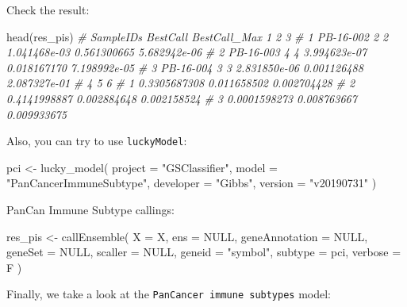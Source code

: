\documentclass[
  12pt,
]{book}
\newenvironment{Shaded}{\begin{snugshade}}{\end{snugshade}}
\newcommand{\AttributeTok}[1]{\textcolor[rgb]{0.77,0.63,0.00}{#1}}
\newcommand{\CommentTok}[1]{\textcolor[rgb]{0.56,0.35,0.01}{\textit{#1}}}
\newcommand{\ConstantTok}[1]{\textcolor[rgb]{0.00,0.00,0.00}{#1}}
\newcommand{\FunctionTok}[1]{\textcolor[rgb]{0.00,0.00,0.00}{#1}}
\newcommand{\NormalTok}[1]{#1}
\newcommand{\OtherTok}[1]{\textcolor[rgb]{0.56,0.35,0.01}{#1}}
\newcommand{\StringTok}[1]{\textcolor[rgb]{0.31,0.60,0.02}{#1}}
\begin{document}
Check the result:

\begin{Shaded}
\begin{Highlighting}[]
\FunctionTok{head}\NormalTok{(res\_pis)}
\CommentTok{\#   SampleIDs BestCall BestCall\_Max            1           2            3}
\CommentTok{\# 1 PB{-}16{-}002        2            2 1.041468e{-}03 0.561300665 5.682942e{-}06}
\CommentTok{\# 2 PB{-}16{-}003        4            4 3.994623e{-}07 0.018167170 7.198992e{-}05}
\CommentTok{\# 3 PB{-}16{-}004        3            3 2.831850e{-}06 0.001126488 2.087327e{-}01}
\CommentTok{\#              4           5           6}
\CommentTok{\# 1 0.3305687308 0.011658502 0.002704428}
\CommentTok{\# 2 0.4141998887 0.002884648 0.002158524}
\CommentTok{\# 3 0.0001598273 0.008763667 0.009933675}
\end{Highlighting}
\end{Shaded}

Also, you can try to use \texttt{luckyModel}:

\begin{Shaded}
\begin{Highlighting}[]
\NormalTok{pci }\OtherTok{\textless{}{-}} \FunctionTok{lucky\_model}\NormalTok{(}
  \AttributeTok{project =} \StringTok{"GSClassifier"}\NormalTok{,}
  \AttributeTok{model =} \StringTok{"PanCancerImmuneSubtype"}\NormalTok{,}
  \AttributeTok{developer =} \StringTok{"Gibbs"}\NormalTok{,}
  \AttributeTok{version =} \StringTok{"v20190731"}
\NormalTok{)}
\end{Highlighting}
\end{Shaded}

PanCan Immune Subtype callings:

\begin{Shaded}
\begin{Highlighting}[]
\NormalTok{res\_pis }\OtherTok{\textless{}{-}} \FunctionTok{callEnsemble}\NormalTok{(}
    \AttributeTok{X =}\NormalTok{ X,}
    \AttributeTok{ens =} \ConstantTok{NULL}\NormalTok{,}
    \AttributeTok{geneAnnotation =} \ConstantTok{NULL}\NormalTok{,}
    \AttributeTok{geneSet =} \ConstantTok{NULL}\NormalTok{,}
    \AttributeTok{scaller =} \ConstantTok{NULL}\NormalTok{,}
    \AttributeTok{geneid =} \StringTok{"symbol"}\NormalTok{,}
    \AttributeTok{subtype =}\NormalTok{ pci,}
    \AttributeTok{verbose =}\NormalTok{ F}
\NormalTok{  )}
\end{Highlighting}
\end{Shaded}

Finally, we take a look at the \texttt{PanCancer\ immune\ subtypes} model:
\end{document}
